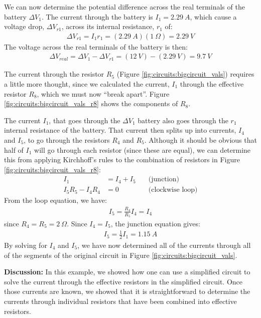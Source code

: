 \begin{example}
We can now determine the potential difference across the real terminals of the battery $\Delta V_1$. The current through the battery is $I_1=\SI{2.29}{A}$, which cause a voltage drop, $\Delta V_{r1}$, across its internal resistance, $r_1$ of:
\begin{align*}
\Delta V_{r1}=I_1r_1=(\SI{2.29}{A})(\SI{1}{\Omega})=\SI{2.29}{V}
\end{align*} 
The voltage across the real terminals of the battery is then:
\begin{align*}
\Delta V_{real}=\Delta V_1-\Delta V_{r1}=(\SI{12}{V})-(\SI{2.29}{V})=\SI{9.7}{V}
\end{align*}

The current through the resistor $R_5$ (Figure \ref{fig:circuits:bigcircuit_vals}) requires a little more thought, since we calculated the current, $I_1$ through the effective resistor $R_8$, which we must now ``break apart''. Figure \ref{fig:circuits:bigcircuit_vals_r8} shows the components of $R_8$. 


The current $I_1$, that goes through the $\Delta V_1$ battery also goes through the $r_1$ internal resistance of the battery. That current then splits up into currents, $I_4$ and $I_5$, to go through the resistors $R_4$ and $R_5$. Although it should be obvious that half of $I_1$ will go through each resistor (since these are equal), we can determine this from applying Kirchhoff's rules to the combination of resistors in Figure \ref{fig:circuits:bigcircuit_vals_r8}:
\begin{align*}
I_1&=I_4+I_5 \quad&\text{(junction)}\\
I_5R_5-I_4R_4&=0\quad&\text{(clockwise loop)}
\end{align*}
From the loop equation, we have:
\begin{align*}
I_5=\frac{R_4}{R_5}I_4=I_4
\end{align*}
since $R_4=R_5=\SI{2}{\Omega}$. Since $I_4=I_5$, the junction equation gives:
\begin{align*}
I_5=\frac{1}{2}I_1=\SI{1.15}{A}
\end{align*}
By solving for $I_4$ and $I_5$, we have now determined all of the currents through all of the segments of the original circuit in Figure \ref{fig:circuits:bigcircuit_vals}.

\textbf{Discussion: }In this example, we showed how one can use a simplified circuit to solve the current through the effective resistors in the simplified circuit. Once those currents are known, we showed that it is straightforward to determine the currents through individual resistors that have been combined into effective resistors.  
\end{example}



